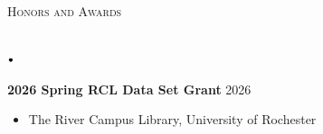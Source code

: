 \documentclass[11pt]{article}
\newcommand{\lineunder}{\vspace*{-8pt} \\ \hspace*{-18pt} \hrulefill \\}
\newcommand{\header}[1]{{\hspace*{-15pt}\vspace*{6pt} \textsc{#1}} \vspace*{-6pt} \lineunder}
\newcommand{\lbt}{\,\begin{picture}(-1,1)(-1,-3)\circle*{3}\end{picture}\ }
\newenvironment{achievements}{
    \begin{list}{$\lbt$}{
        \topsep 0pt
        \itemsep 0pt
        \addtolength{\leftmargin}{-0.1in}
    }
}
{
    \vspace*{4pt}
    \end{list}
}
\begin{document}
\header{\Large{Honors and Awards}}
\vspace{2mm}
\begin{achievements}
\item \textbf{2026 Spring RCL Data Set Grant} \hfill{} 2026
    \begin{itemize}
        \item[-] The River Campus Library, University of Rochester 
    \end{itemize}
\end{achievements}
\bigskip






\end{document}
